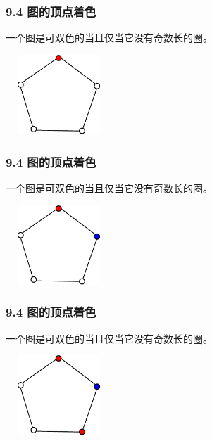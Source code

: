 \documentclass{beamer}
\begin{document}
\begin{CJK}{UTF8}{gbsn}
\begin{frame}
  \frametitle{9.4 图的顶点着色}
  \begin{theorem9.4.1}
    一个图是可双色的当且仅当它没有奇数长的圈。
  \end{theorem9.4.1}
\vspace{1cm}
  \begin{minipage}{0.45\linewidth}
\includegraphics[width=4cm,height=3cm]{pentagon1}    
  \end{minipage}
  \begin{minipage}{0.45\linewidth}
   
  \end{minipage}
\end{frame}
\begin{frame}
  \frametitle{9.4 图的顶点着色}
  \begin{theorem9.4.1}
    一个图是可双色的当且仅当它没有奇数长的圈。
  \end{theorem9.4.1}
\vspace{1cm}
  \begin{minipage}{0.45\linewidth}
\includegraphics[width=4cm,height=3cm]{pentagon2}    
  \end{minipage}
  \begin{minipage}{0.45\linewidth}
   
  \end{minipage}
\end{frame}

\begin{frame}
  \frametitle{9.4 图的顶点着色}
  \begin{theorem9.4.1}
    一个图是可双色的当且仅当它没有奇数长的圈。
  \end{theorem9.4.1}
\vspace{1cm}
  \begin{minipage}{0.45\linewidth}
\includegraphics[width=4cm,height=3cm]{pentagon3}    
  \end{minipage}
  \begin{minipage}{0.45\linewidth}
   

\end{minipage}
\end{frame}
\end{CJK}
\end{document}
